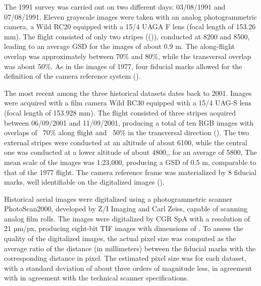 The 1991 survey was carried out on two different days: 03/08/1991 and 07/08/1991.
Eleven grayscale images were taken with an analog photogrammetric camera, a Wild RC20
equipped with a 15/4 UAGA F lens (focal length of 153.26 mm). The flight consisted of only
two stripes (()), conducted at \SI{8200}{\masl} and \SI{8500}{\masl}, leading to an average
GSD for the images of about 0.9 m. The along-flight overlap was approximately between
70\% and 80\%, while the transversal overlap was about 50\%. As in the images of 1977, four
fiducial marks allowed for the definition of the camera reference system ().

The most recent among the three historical datasets dates back to 2001. Images were
acquired with a film camera Wild RC30 equipped with a 15/4 UAG-S lens (focal length
of 153.928 mm). The flight consisted of three stripes acquired between 06/09/2001 and
11/09/2001, producing a total of ten RGB images with overlaps of ~70\% along flight and
~50\% in the transversal direction (). The two external stripes were conducted at an
altitude of about \SI{6100}{\masl}, while the central one was conducted at a lower altitude of
about \SI{4800}{\masl},, for an average of \SI{5800}{\masl}, The mean scale of the images was 1:23,000, producing a GSD of 0.5 m, comparable to that of the 1977 flight. 
The camera reference frame was materialized by 8 fiducial marks, well identifiable on the digitalized images ().

Historical aerial images were digitalized using a photogrammetric scanner PhotoScan2000, developed by Z/I Imaging and Carl Zeiss, capable of scanning analog film rolls. 
The images were digitalized by CGR SpA with a resolution of 21 µm/px, producing eight-bit TIF 
images with dimensions of . 
To assess the quality of the digitalized images, the actual pixel size was computed as the average ratio of the distance (in millimeters) between the fiducial marks with the corresponding distance in pixel. The estimated pixel size was  for each dataset, with a standard deviation of about three orders of magnitude less, in agreement with in agreement with the technical scanner specifications.

